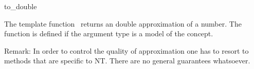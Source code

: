 \begin{ccRefFunction}{to_double}

\ccDefinition

The template function \ccRefName\ returns an double approximation of a number. 
The function is defined if the argument type 
is a model of the  concept. 

Remark: In order to control the quality of approximation one has to resort to methods that are specific to NT. There are no general guarantees whatsoever.


{}

\ccSeeAlso

\\
\\

\end{ccRefFunction}
